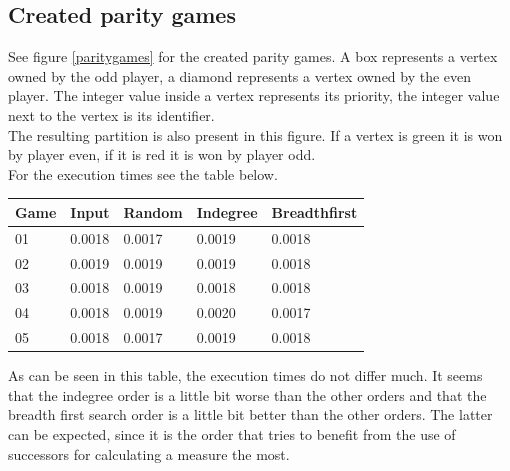 \documentclass[10pt,a4paper]{article}
\begin{document}
\subsection{Created parity games}

See figure \ref{paritygames} for the created parity games. A box represents a vertex owned by the odd player, a diamond represents a vertex owned by the even player. The integer value inside a vertex represents its priority, the integer value next to the vertex is its identifier.\\
The resulting partition is also present in this figure. If a vertex is green it is won by player even, if it is red it is won by player odd.\\
For the execution times see the table below.

\begin{tabular}{l l l l l}
	Game	& Input	 & Random & Indegree & Breadthfirst \\\hline
	01		& 0.0018 & 0.0017 & 0.0019   & 0.0018 \\
	02		& 0.0019 & 0.0019 & 0.0019   & 0.0018 \\
	03		& 0.0018 & 0.0019 & 0.0018 	 & 0.0018 \\
	04		& 0.0018 & 0.0019 & 0.0020	 & 0.0017 \\
	05		& 0.0018 & 0.0017 & 0.0019	 & 0.0018 
\end{tabular}

As can be seen in this table, the execution times do not differ much. It seems that the indegree order is a little bit worse than the other orders and that the breadth first search order is a little bit better than the other orders. The latter can be expected, since it is the order that tries to benefit from the use of successors for calculating a measure the most.
\end{document}
